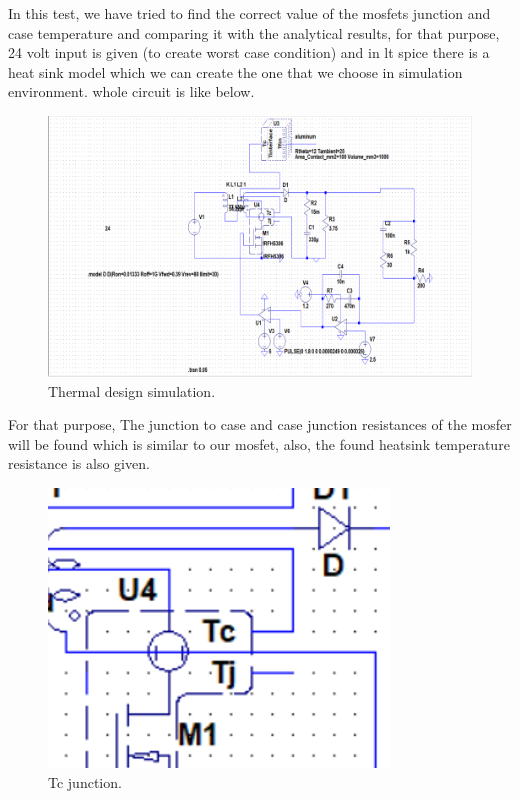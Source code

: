 \documentclass{article}
\begin{document}
  In this test, we have tried to find the correct value of the mosfets junction and case temperature and comparing it with the analytical results, for that purpose, 24 volt input is given (to create worst case condition) and in lt spice there is a heat sink model which we can create the one that we choose in simulation environment. whole circuit is like below.

\begin{figure}[H]
    \centering
    \includegraphics[scale=0.8]{t1.png}
    \caption{Thermal design simulation.}
    \label{fig:my_label}
\end{figure}


For that purpose, The junction to case and case junction resistances of the mosfer will be found which is similar to our mosfet, also, the found heatsink temperature resistance is also given.

\begin{figure}[H]
    \centering
    \includegraphics[scale=0.8]{t2.png}
    \caption{Tc junction.}
    \label{fig:my_label}
\end{figure}
\end{document}
